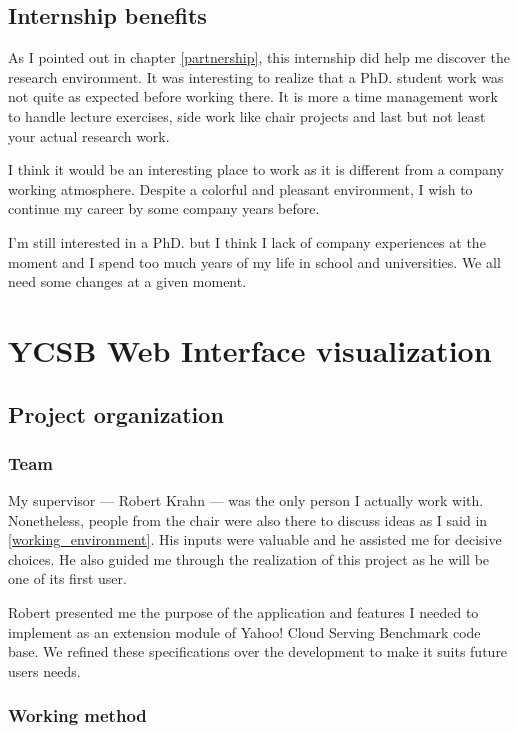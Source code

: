 \documentclass[a4paper,11pt]{report}
\begin{document}
\section{Internship benefits}

As I pointed out in chapter \ref{partnership}, this internship did help me discover the research environment. It was interesting to realize that a PhD. student work was not quite as expected before working there. It is more a time management work to handle lecture exercises, side work like chair projects and last but not least your actual research work.

I think it would be an interesting place to work as it is different from a company working atmosphere. Despite a colorful and pleasant environment, I wish to continue my career by some company years before. 

I'm still interested in a PhD. but I think I lack of company experiences at the moment and I spend too much years of my life in school and universities. We all need some changes at a given moment.

\clearpage

\chapter{YCSB Web Interface visualization}

\section{Project organization}

\subsection{Team}

My supervisor --- Robert Krahn --- was the only person I actually work with. Nonetheless, people from the chair were also there to discuss ideas as I said in \ref{working_environment}. His inputs were valuable and he assisted me for decisive choices. He also guided me through the realization of this project as he will be one of its first user.

Robert presented me the purpose of the application and features I needed to implement as an extension module of Yahoo! Cloud Serving Benchmark code base. We refined these specifications over the development to make it suits future users needs.

\subsection{Working method}\label{working_method}
\end{document}

